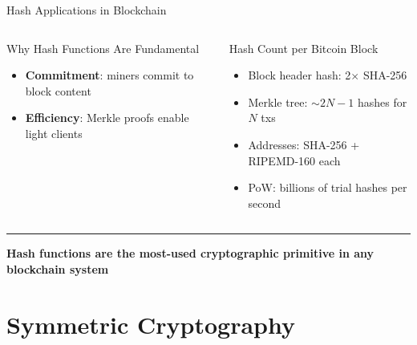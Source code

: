 \documentclass[8pt,aspectratio=169]{beamer}
\newcommand{\bottomnote}[1]{\vfill\vspace{-2mm}\textcolor{mllavender2}{\rule{\textwidth}{0.4pt}}\vspace{1mm}\footnotesize\textbf{#1}}
\begin{document}
\begin{frame}{Hash Applications in Blockchain}
\begin{columns}
\begin{block}{Why Hash Functions Are Fundamental}
\begin{itemize}
  \item \textbf{Commitment}: miners commit to block content
  \item \textbf{Efficiency}: Merkle proofs enable light clients
\end{itemize}
\end{block}
\begin{block}{Hash Count per Bitcoin Block}
\begin{itemize}\small
  \item Block header hash: 2$\times$ SHA-256
  \item Merkle tree: $\sim 2N-1$ hashes for $N$ txs
  \item Addresses: SHA-256 + RIPEMD-160 each
  \item PoW: billions of trial hashes per second
\end{itemize}
\end{block}
\end{columns}
\bottomnote{Hash functions are the most-used cryptographic primitive in any blockchain system}
\end{frame}

\section{Symmetric Cryptography}
\end{document}
